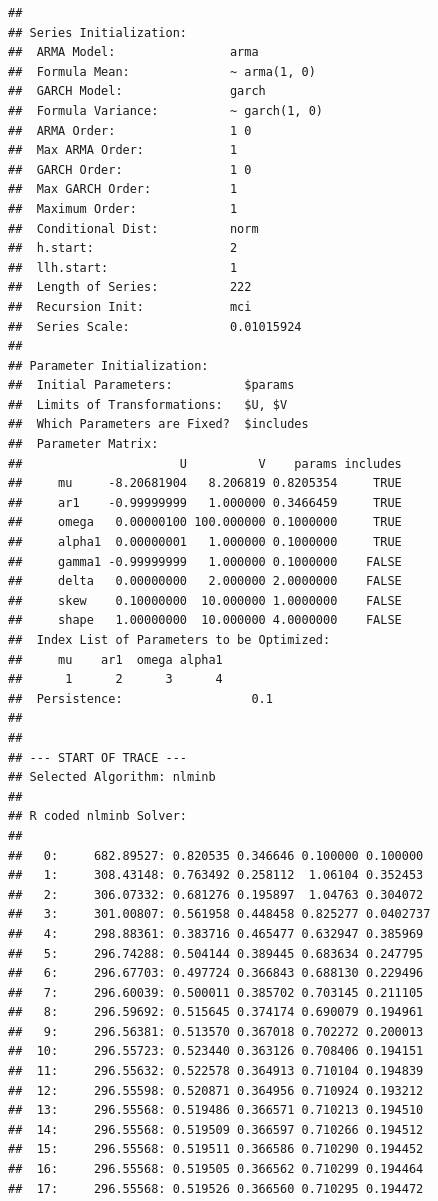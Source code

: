 \documentclass[
]{book}
\theoremstyle{definition}
\theoremstyle{definition}
\theoremstyle{definition}
\theoremstyle{definition}
\theoremstyle{remark}
\begin{document}
\begin{verbatim}
## 
## Series Initialization:
##  ARMA Model:                arma
##  Formula Mean:              ~ arma(1, 0)
##  GARCH Model:               garch
##  Formula Variance:          ~ garch(1, 0)
##  ARMA Order:                1 0
##  Max ARMA Order:            1
##  GARCH Order:               1 0
##  Max GARCH Order:           1
##  Maximum Order:             1
##  Conditional Dist:          norm
##  h.start:                   2
##  llh.start:                 1
##  Length of Series:          222
##  Recursion Init:            mci
##  Series Scale:              0.01015924
## 
## Parameter Initialization:
##  Initial Parameters:          $params
##  Limits of Transformations:   $U, $V
##  Which Parameters are Fixed?  $includes
##  Parameter Matrix:
##                      U          V    params includes
##     mu     -8.20681904   8.206819 0.8205354     TRUE
##     ar1    -0.99999999   1.000000 0.3466459     TRUE
##     omega   0.00000100 100.000000 0.1000000     TRUE
##     alpha1  0.00000001   1.000000 0.1000000     TRUE
##     gamma1 -0.99999999   1.000000 0.1000000    FALSE
##     delta   0.00000000   2.000000 2.0000000    FALSE
##     skew    0.10000000  10.000000 1.0000000    FALSE
##     shape   1.00000000  10.000000 4.0000000    FALSE
##  Index List of Parameters to be Optimized:
##     mu    ar1  omega alpha1 
##      1      2      3      4 
##  Persistence:                  0.1 
## 
## 
## --- START OF TRACE ---
## Selected Algorithm: nlminb 
## 
## R coded nlminb Solver: 
## 
##   0:     682.89527: 0.820535 0.346646 0.100000 0.100000
##   1:     308.43148: 0.763492 0.258112  1.06104 0.352453
##   2:     306.07332: 0.681276 0.195897  1.04763 0.304072
##   3:     301.00807: 0.561958 0.448458 0.825277 0.0402737
##   4:     298.88361: 0.383716 0.465477 0.632947 0.385969
##   5:     296.74288: 0.504144 0.389445 0.683634 0.247795
##   6:     296.67703: 0.497724 0.366843 0.688130 0.229496
##   7:     296.60039: 0.500011 0.385702 0.703145 0.211105
##   8:     296.59692: 0.515645 0.374174 0.690079 0.194961
##   9:     296.56381: 0.513570 0.367018 0.702272 0.200013
##  10:     296.55723: 0.523440 0.363126 0.708406 0.194151
##  11:     296.55632: 0.522578 0.364913 0.710104 0.194839
##  12:     296.55598: 0.520871 0.364956 0.710924 0.193212
##  13:     296.55568: 0.519486 0.366571 0.710213 0.194510
##  14:     296.55568: 0.519509 0.366597 0.710266 0.194512
##  15:     296.55568: 0.519511 0.366586 0.710290 0.194452
##  16:     296.55568: 0.519505 0.366562 0.710299 0.194464
##  17:     296.55568: 0.519526 0.366560 0.710295 0.194472

\end{verbatim}
\end{document}
